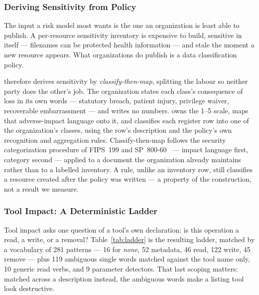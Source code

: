 \subsubsection{Deriving Sensitivity from Policy}
\label{sec:sensitivity}

The input a risk model most wants is the one an organization is least able to
publish. A per-resource sensitivity inventory is expensive to build, sensitive
in itself --- filenames can be protected health information --- and stale the
moment a new resource appears. What organizations do publish is a data
classification policy.

\framework{} therefore derives sensitivity by \emph{classify-then-map},
splitting the labour so neither party does the other's job. The organization
states each class's consequence of loss in its own words ---
statutory breach, patient injury, privilege waiver, recoverable embarrassment
--- and writes no numbers. \framework{} owns the 1--5 scale, maps that
adverse-impact language onto it, and classifies each register row into one of
the organization's classes, using the row's description and the policy's own
recognition and aggregation rules. Classify-then-map follows the security
categorization procedure of FIPS~199 and
SP~800-60~\cite{nist2004fips199,nist2008sp80060} --- impact language first,
category second --- applied to a document the organization already maintains
rather than to a labelled inventory. A rule, unlike an inventory row, still
classifies a resource created after the policy was written --- a property of
the construction, not a result we measure.

\subsubsection{Tool Impact: A Deterministic Ladder}
\label{sec:impact}

Tool impact asks one question of a tool's own declaration: is this operation a
read, a write, or a removal? Table~\ref{tab:ladder} is the resulting ladder,
matched by a vocabulary of 281 patterns --- 16 for \emph{none}, 52 metadata, 46
read, 122 write, 45 remove --- plus 119 ambiguous single words matched against
the tool name only, 10 generic read verbs, and 9 parameter detectors. That last
scoping matters: matched across a description instead, the ambiguous words make
a listing tool look destructive.

